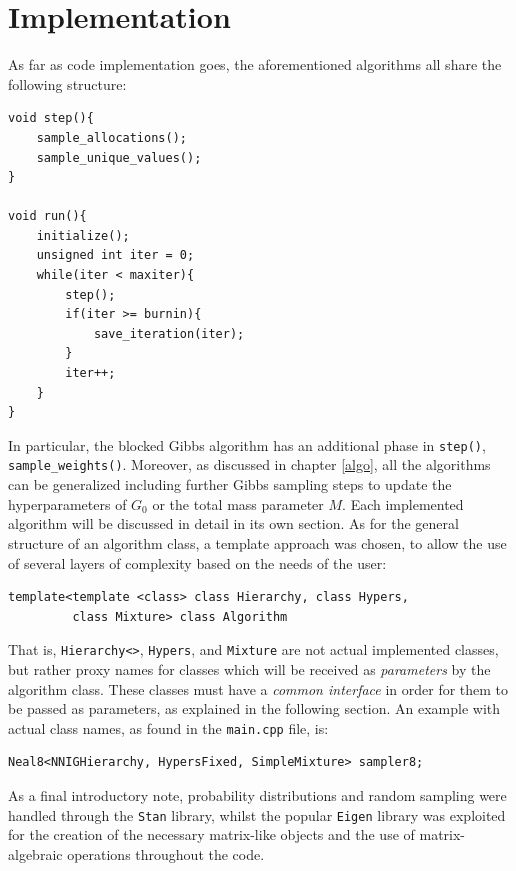 \chapter{Implementation}
As far as code implementation goes, the aforementioned algorithms all share the following structure:
\begin{verbatim}
void step(){
    sample_allocations();
    sample_unique_values();
}

void run(){
    initialize();
    unsigned int iter = 0;
    while(iter < maxiter){
        step();
        if(iter >= burnin){
            save_iteration(iter);
        }
        iter++;
    }
}
\end{verbatim}
In particular, the blocked Gibbs algorithm has an additional phase in \verb|step()|, \verb|sample_weights()|. Moreover, as discussed in chapter \ref{algo}, all the algorithms can be generalized including further Gibbs sampling steps to update the hyperparameters of $G_0$ or the total mass parameter $M$.
Each implemented algorithm will be discussed in detail in its own section.
As for the general structure of an algorithm class, a template approach was chosen, to allow the use of several layers of complexity based on the needs of the user:
\begin{verbatim}
template<template <class> class Hierarchy, class Hypers,
         class Mixture> class Algorithm
\end{verbatim}
That is, \verb|Hierarchy<>|, \verb|Hypers|, and \verb|Mixture| are not actual implemented classes, but rather proxy names for classes which will be received as \emph{parameters} by the algorithm class.
These classes must have a \emph{common interface} in order for them to be passed as parameters, as explained in the following section.
An example with actual class names, as found in the \verb|main.cpp| file, is:
\begin{verbatim}
Neal8<NNIGHierarchy, HypersFixed, SimpleMixture> sampler8;
\end{verbatim}
As a final introductory note, probability distributions and random sampling were handled through the \verb|Stan| library, whilst the popular \verb|Eigen| library was exploited for the creation of the necessary matrix-like objects and the use of matrix-algebraic operations throughout the code.

